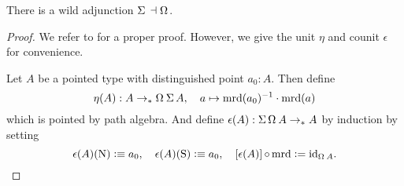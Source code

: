 \documentclass[english,a4paper]{lmcs}
\def\githubpath{\tt\small}
\begin{document}
\begin{prop}
  There is a wild adjunction $\susp \null \leftadjto \loopspace \null$.
  \label{prop:susp-loop-adjunction}
\end{prop}
\begin{proof}
  We refer to \cite[\githubpath
  theorems/homotopy/SuspAdjointLoop.agda]{hott-agda} for a proper proof.
  However, we give the unit $\eta$ and counit $\epsilon$ for convenience.

  Let $A$ be a pointed type with distinguished point $a_0:A$. Then define
  \begin{displaymath}
    \eta(A) : A \ptdto \loopspace\null\susp A, \quad
    a \mapsto \inv{\mrd(a_0)} \cdot \mrd(a)
  \end{displaymath}
  which is pointed by path algebra.
  And define $\epsilon(A) : \susp \loopspace \null A \ptdto A$ by induction by
  setting
  \begin{displaymath}
    \epsilon(A)(\north) \defequi a_0,\quad
    \epsilon(A)(\south) \defequi a_0,\quad
    \ap{\epsilon(A)}\circ \mrd \defis \id_{\loopspace\null A}.\qedhere
  \end{displaymath}

\end{proof}
\end{document}
